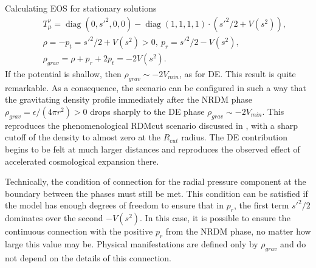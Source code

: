 \documentclass{article}
\def\diag{\mathop{\mbox{diag}}}
\begin{document}
Calculating EOS for stationary solutions 
\begin{eqnarray}
&&T_\mu^\nu=\diag(0,s'^2,0,0)-\diag(1,1,1,1)\cdot(s'^2/2+V(s^2)),\\
&&\rho=-p_t=s'^2/2+V(s^2)>0,\ p_r=s'^2/2-V(s^2),\\
&&\rho_{grav}=\rho+p_r+2p_t=-2V(s^2).
\end{eqnarray}
If the potential is shallow, then $ \rho_ {grav} \sim-2V_ {min} $, as for DE. This result is quite remarkable. As a consequence, the scenario can be configured in such a way that the gravitating density profile immediately after the NRDM phase $ \rho_ {grav} = \epsilon / (4 \pi r ^ 2)> 0 $ drops sharply to the DE phase $ \rho_ {grav} \sim-2V_ {min} $. This reproduces the phenomenological RDMcut scenario discussed in \cite {bled2020}, with a sharp cutoff of the density to almost zero at the $ R_ {cut} $ radius. The DE contribution begins to be felt at much larger distances and reproduces the observed effect of accelerated cosmological expansion there.

Technically, the condition of connection for the radial pressure component at the boundary between the phases must still be met. This condition can be satisfied if the model has enough degrees of freedom to ensure that in $ p_r $, the first term $ s'^2/2 $ dominates over the second $ -V (s ^ 2) $. In this case, it is possible to ensure the continuous connection with the positive $ p_r $ from the NRDM phase, no matter how large this value may be. Physical manifestations are defined only by $ \rho_ {grav} $ and do not depend on the details of this connection.
\end{document}
